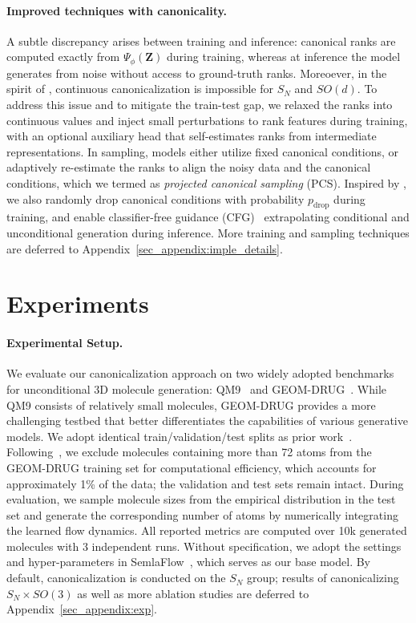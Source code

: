 \documentclass{article}
\theoremstyle{plain}
\theoremstyle{definition}
\theoremstyle{remark}
\newcommand{\1}{\mathbf{1}}
\newcommand{\Z}{\mathbf{Z}}
\begin{document}
\paragraph{Improved techniques with canonicality.}
A subtle discrepancy arises between training and inference: canonical ranks are computed exactly from $\Psi_\phi(\Z)$ during training, whereas at inference the model generates from noise without access to ground-truth ranks.
Moreoever, in the spirit of \citep{dym2024equivariant}, continuous canonicalization is impossible for $S_N$ and $SO(d)$. To address this issue and to mitigate the train-test gap, we relaxed the ranks into continuous values and inject small perturbations to rank features during training, with an optional auxiliary head that self-estimates ranks from intermediate representations. In sampling, models either utilize fixed canonical conditions, or adaptively re-estimate the ranks to align the noisy data and the canonical conditions, which we termed as \emph{projected canonical sampling} (PCS). Inspired by \cite{li2024geometric}, we also randomly drop canonical conditions with probability $p_{\text{drop}}$ during training, and enable classifier-free guidance (CFG)~\citep{ho2022classifier} extrapolating conditional and unconditional generation during inference.
More training and sampling techniques are deferred to Appendix~\ref{sec_appendix:imple_details}.

\section{Experiments}\label{sec:exp}

\paragraph{Experimental Setup.} 
We evaluate our canonicalization approach on two widely adopted benchmarks for unconditional 3D molecule generation: QM9~\citep{ramakrishnan2014quantum} and GEOM-DRUG~\citep{axelrod2022geom}. 
While QM9 consists of relatively small molecules, GEOM-DRUG provides a more challenging testbed that better differentiates the capabilities of various generative models.
We adopt identical train/validation/test splits as prior work~\citep{vignac2023midi, le2023navigating}.
Following~\citep{irwin2024semlaflow}, we exclude molecules containing more than 72 atoms from the GEOM-DRUG training set for computational efficiency, which accounts for approximately 1\% of the data; the validation and test sets remain intact.
During evaluation, we sample molecule sizes from the empirical distribution in the test set and generate the corresponding number of atoms by numerically integrating the learned flow dynamics.
All reported metrics are computed over 10k generated molecules with 3 independent runs. Without specification, we adopt the settings and hyper-parameters in SemlaFlow~\citep{irwin2024semlaflow}, which serves as our base model. By default, canonicalization is conducted on the $S_N$ group; results of canonicalizing $S_N\times SO(3)$ as well as more ablation studies are deferred to Appendix~\ref{sec_appendix:exp}. 
\end{document}
